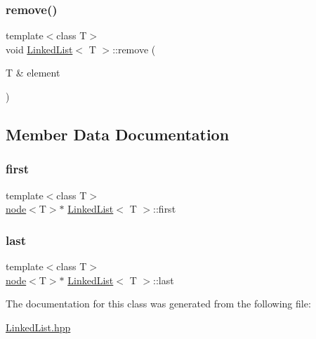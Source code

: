\mbox{\label{class_linked_list_ad2958c4e9413017f354613a5ffe0fc9e}} 
\subsubsection{\texorpdfstring{remove()}{remove()}}
{\footnotesize\ttfamily template$<$class T$>$ \\
void \mbox{\hyperlink{class_linked_list}{Linked\+List}}$<$ T $>$\+::remove (\begin{DoxyParamCaption}\item[{T \&}]{element }\end{DoxyParamCaption})\hspace{0.3cm}{\ttfamily [inline]}}



\subsection{Member Data Documentation}
\mbox{\label{class_linked_list_acaeb0499689a66aa0f0c6f71864da9a2}} 
\subsubsection{\texorpdfstring{first}{first}}
{\footnotesize\ttfamily template$<$class T$>$ \\
\mbox{\hyperlink{structnode}{node}}$<$T$>$$\ast$ \mbox{\hyperlink{class_linked_list}{Linked\+List}}$<$ T $>$\+::first\hspace{0.3cm}{\ttfamily [private]}}

\mbox{\label{class_linked_list_ab584a6000168e8e43549dffda60240b2}} 
\subsubsection{\texorpdfstring{last}{last}}
{\footnotesize\ttfamily template$<$class T$>$ \\
\mbox{\hyperlink{structnode}{node}}$<$T$>$$\ast$ \mbox{\hyperlink{class_linked_list}{Linked\+List}}$<$ T $>$\+::last\hspace{0.3cm}{\ttfamily [private]}}



The documentation for this class was generated from the following file\+:\begin{DoxyCompactItemize}
\item 
\mbox{\hyperlink{_linked_list_8hpp}{Linked\+List.\+hpp}}\end{DoxyCompactItemize}

